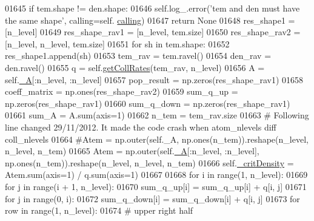 \begin{DoxyCode}
01645             \textcolor{keywordflow}{if} tem.shape != den.shape:
01646                 self.log\_.error(\textcolor{stringliteral}{'tem and den must have the same shape'}, calling=self.
      \hyperlink{classpyneb_1_1core_1_1pynebcore_1_1_atom_a373b7735acf4f528b54bddf373ad67a1}{calling})
01647                 \textcolor{keywordflow}{return} \textcolor{keywordtype}{None}
01648             res\_shape1 = [n\_level]
01649             res\_shape\_rav1 = [n\_level, tem.size]
01650             res\_shape\_rav2 = [n\_level, n\_level, tem.size]
01651             \textcolor{keywordflow}{for} sh \textcolor{keywordflow}{in} tem.shape:
01652                 res\_shape1.append(sh)
01653             tem\_rav = tem.ravel()
01654             den\_rav = den.ravel()
01655             q = self.\hyperlink{classpyneb_1_1core_1_1pynebcore_1_1_atom_a34711ea989baf7bde752a68255d32098}{getCollRates}(tem\_rav, n\_level)
01656             A = self.\hyperlink{classpyneb_1_1core_1_1pynebcore_1_1_atom_aa6416fe661b8deaa008179314727e025}{\_A}[:n\_level, :n\_level]
01657             pop\_result = np.zeros(res\_shape\_rav1)
01658             coeff\_matrix = np.ones(res\_shape\_rav2)
01659             sum\_q\_up = np.zeros(res\_shape\_rav1)
01660             sum\_q\_down = np.zeros(res\_shape\_rav1)
01661             sum\_A = A.sum(axis=1)
01662             n\_tem = tem\_rav.size
01663             \textcolor{comment}{# Following line changed 29/11/2012. It made the code crash when atom\_nlevels diff coll\_nlevels}
01664             \textcolor{comment}{#Atem = np.outer(self.\_A, np.ones(n\_tem)).reshape(n\_level, n\_level, n\_tem)}
01665             Atem = np.outer(self.\hyperlink{classpyneb_1_1core_1_1pynebcore_1_1_atom_aa6416fe661b8deaa008179314727e025}{\_A}[:n\_level, :n\_level], np.ones(n\_tem)).reshape(n\_level, n\_level, n\_tem)
01666             self.\hyperlink{classpyneb_1_1core_1_1pynebcore_1_1_atom_a1d0823a36ca030fd149522fe72908631}{\_critDensity} = Atem.sum(axis=1) / q.sum(axis=1)
01667 
01668             \textcolor{keywordflow}{for} i \textcolor{keywordflow}{in} range(1, n\_level):
01669                 \textcolor{keywordflow}{for} j \textcolor{keywordflow}{in} range(i + 1, n\_level):
01670                     sum\_q\_up[i] = sum\_q\_up[i] + q[i, j]
01671                 \textcolor{keywordflow}{for} j \textcolor{keywordflow}{in} range(0, i):
01672                     sum\_q\_down[i] = sum\_q\_down[i] + q[i, j]
01673             \textcolor{keywordflow}{for} row \textcolor{keywordflow}{in} range(1, n\_level):
01674                 \textcolor{comment}{# upper right half            }

\end{DoxyCode}
